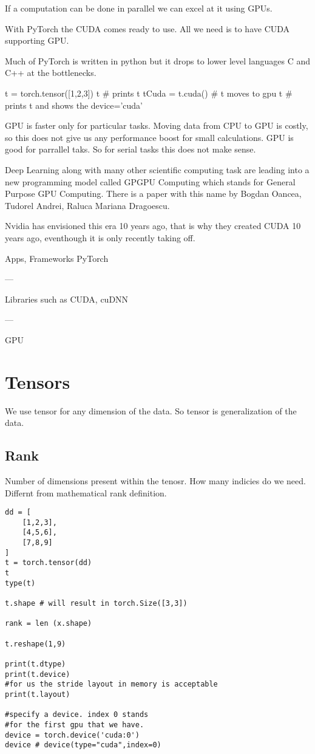 \documentclass[11pt,twoside,a4paper]{report}
\begin{document}
If a computation can be done in parallel we can excel at it using GPUs.

With PyTorch the CUDA comes ready to use. All we need is to have CUDA supporting GPU.

Much of PyTorch is written in python but it drops to lower level languages C and C++ at the bottlenecks.


t = torch.tensor([1,2,3])
t \# prints t
tCuda = t.cuda() \# t moves to gpu
t \# prints t and shows the device='cuda'



GPU is faster only for particular tasks. Moving data from CPU to GPU is costly, so this does not give us any performance boost for small calculations.
GPU is good for parrallel taks. So for serial tasks this does not make sense.

Deep Learning along with many other scientific computing task are leading into a new programming model called GPGPU Computing which stands for General Purpose
GPU Computing. There is a paper with this name by Bogdan Oancea, Tudorel Andrei, Raluca Mariana Dragoescu.

Nvidia has envisioned this era 10 years ago, that is why they created CUDA 10 years ago, eventhough it is only recently taking off. 


Apps, Frameworks
PyTorch

---

Libraries such as CUDA, cuDNN

---

GPU

\chapter{Tensors}
We use tensor for any dimension of the data. So tensor is generalization of the data.

\section{Rank}
Number of dimensions present within the tenosr. How many indicies do we need. Differnt from mathematical rank definition.

\begin{lstlisting}
dd = [
    [1,2,3],
    [4,5,6],
    [7,8,9]
]
t = torch.tensor(dd)
t
type(t)

t.shape # will result in torch.Size([3,3])

rank = len (x.shape)

t.reshape(1,9)

print(t.dtype)
print(t.device)
#for us the stride layout in memory is acceptable
print(t.layout)

#specify a device. index 0 stands 
#for the first gpu that we have.
device = torch.device('cuda:0')
device # device(type="cuda",index=0)
\end{lstlisting}
\end{document}
